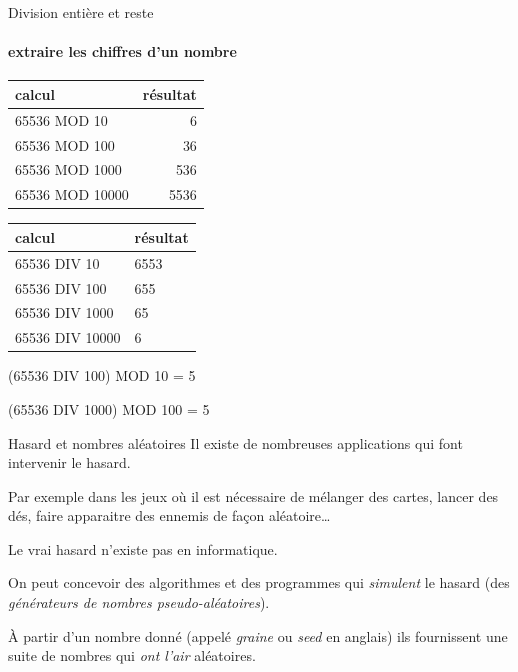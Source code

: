 \begin{hideedit}
\begin{frame}[fragile]{Division entière et reste}
\framesubtitle{extraire les chiffres d'un nombre}
  \begin{center}
  \begin{tabular}{|l|r|}\hline
    \rowcolor{black!20}
    calcul & résultat \\
    \hline
    65536 MOD 10 & 6 \\
    65536 MOD 100 & 36 \\
    65536 MOD 1000 & 536 \\
    65536 MOD 10000 & 5536 \\
    \hline 
  \end{tabular}
  \qquad
  \begin{tabular}{|l|l|}\hline
    \rowcolor{black!20}
    calcul & résultat \\
    \hline
    65536 DIV 10 & 6553 \\
    65536 DIV 100 & 655 \\
    65536 DIV 1000 & 65 \\
    65536 DIV 10000 & 6 \\
    \hline
  \end{tabular}
  \end{center}

  \begin{example}
    \pause
    (65536 DIV 100) MOD 10 = 5
  \end{example}

  \pause
  \begin{example}
    \pause
    (65536 DIV 1000) MOD 100 = 5  \end{example}
\end{frame}

\begin{frame}{Hasard et nombres aléatoires}
  Il existe de nombreuses applications qui font intervenir le hasard.

  Par exemple dans les jeux où il est nécessaire de mélanger des
  cartes, lancer des dés, faire apparaitre des ennemis de façon
  aléatoire\dots

  Le vrai hasard \og n’existe pas \fg en informatique.

  On peut concevoir des algorithmes et des programmes
  qui \emph{simulent} le hasard (des \emph{générateurs de nombres
  pseudo-aléatoires}).

  À partir d’un nombre donné
  (appelé \emph{graine} ou \emph{seed} en anglais)
  ils fournissent une suite de nombres qui \emph{ont l’air}
  aléatoires.
\end{frame}


\end{hideedit}
